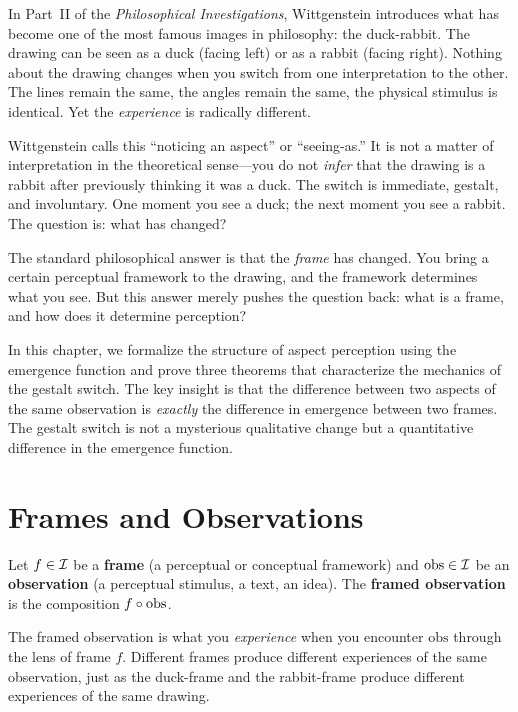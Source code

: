 In Part~II of the \textit{Philosophical Investigations}, Wittgenstein
introduces what has become one of the most famous images in philosophy:
the duck-rabbit.  The drawing can be seen as a duck (facing left) or
as a rabbit (facing right).  Nothing about the drawing changes when
you switch from one interpretation to the other.  The lines remain the
same, the angles remain the same, the physical stimulus is identical.
Yet the \emph{experience} is radically different.

Wittgenstein calls this ``noticing an aspect'' or ``seeing-as.''  It is
not a matter of interpretation in the theoretical sense---you do not
\emph{infer} that the drawing is a rabbit after previously thinking it
was a duck.  The switch is immediate, gestalt, and involuntary.  One
moment you see a duck; the next moment you see a rabbit.  The question
is: what has changed?

The standard philosophical answer is that the \emph{frame} has changed.
You bring a certain perceptual framework to the drawing, and the
framework determines what you see.  But this answer merely pushes the
question back: what is a frame, and how does it determine perception?

In this chapter, we formalize the structure of aspect perception using
the emergence function and prove three theorems that characterize the
mechanics of the gestalt switch.  The key insight is that the
difference between two aspects of the same observation is \emph{exactly}
the difference in emergence between two frames.  The gestalt switch
is not a mysterious qualitative change but a quantitative difference
in the emergence function.

\section{Frames and Observations}

\begin{definition}
\label{def:framed-observation}
Let $f \in \mathcal{I}$ be a \textbf{frame} (a perceptual or conceptual
framework) and $\mathrm{obs} \in \mathcal{I}$ be an \textbf{observation}
(a perceptual stimulus, a text, an idea).  The \textbf{framed
observation} is the composition $f \circ \mathrm{obs}$.
\end{definition}

The framed observation is what you \emph{experience} when you encounter
$\mathrm{obs}$ through the lens of frame $f$.  Different frames
produce different experiences of the same observation, just as the
duck-frame and the rabbit-frame produce different experiences of the
same drawing.

